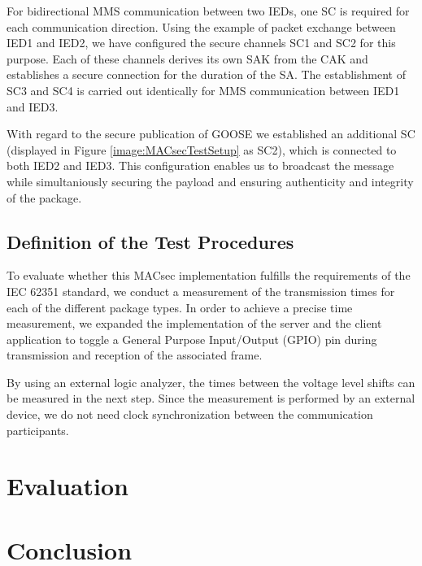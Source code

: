 \documentclass[conference, onecolumn, a4paper]{IEEEtran}
\begin{document}
\smallskip
For bidirectional MMS communication between two IEDs, one SC is required for each communication direction. Using the example of packet exchange between 
IED1 and IED2, we have configured the secure channels SC1 and SC2 for this purpose. Each of these channels derives its own SAK from the CAK and 
establishes a secure connection for the duration of the SA. The establishment of SC3 and SC4 is carried out identically for MMS communication between 
IED1 and IED3.

\smallskip
With regard to the secure publication of GOOSE we established an additional SC (displayed in Figure \ref{image:MACsecTestSetup} as SC2), which is 
connected to both IED2 and IED3. This configuration enables us to broadcast the message while simultaniously securing the payload and ensuring 
authenticity and integrity of the package.  

\subsection{Definition of the Test Procedures}
\label{subchapter:TestProcedures}
\noindent To evaluate whether this MACsec implementation fulfills the requirements of the IEC 62351 standard, we conduct a measurement of the 
transmission times for each of the different package types. In order to achieve a precise time measurement, we expanded the implementation of the server 
and the client application to toggle a General Purpose Input/Output (GPIO) pin during transmission and reception of the associated frame. 

\smallskip
By using an external logic analyzer, the times between the voltage level shifts can be measured in the next step. Since the measurement is performed by 
an external device, we do not need clock synchronization between the communication participants.

\section{Evaluation}
\label{chapter:evaluation}


\section{Conclusion}
\label{chapter:conclusion}


\printbibliography

\end{document}
